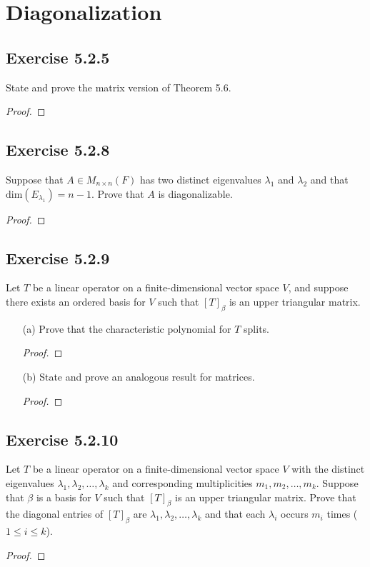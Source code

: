\section{Diagonalization}

\subsection*{Exercise 5.2.5} State and prove the matrix version of Theorem 5.6.
\begin{proof}

\end{proof}

\subsection*{Exercise 5.2.8} Suppose that \( A \in {M}_{n \times n }(F) \) has two distinct eigenvalues \( {\lambda}_{1} \) and \( {\lambda}_{2} \) and that \( \text{dim}({E}_{{\lambda}_{1}}) = n - 1  \). Prove that \( A  \) is diagonalizable.
\begin{proof}

\end{proof}

\subsection*{Exercise 5.2.9} Let \( T \) be a linear operator on a finite-dimensional vector space \( V  \), and suppose there exists an ordered basis for \( V  \) such that \( [T]_{\beta} \) is an upper triangular matrix.  
\begin{enumerate}
    \item[(a)] Prove that the characteristic polynomial for \( T  \) splits.
        \begin{proof}
        
        \end{proof}
    \item[(b)] State and prove an analogous result for matrices.
        \begin{proof}
        
        \end{proof}
\end{enumerate}

\subsection*{Exercise 5.2.10} Let \( T  \) be a linear operator on a finite-dimensional vector space \( V  \) with the distinct eigenvalues \( {\lambda}_{1}, {\lambda}_{2}, \dots, {\lambda}_{k} \) and corresponding multiplicities \( {m}_{1}, {m}_{2}, \dots, {m}_{k}  \). Suppose that \( \beta \) is a basis for \( V  \) such that \( [T]_{\beta} \) is an upper triangular matrix. Prove that the diagonal entries of \( [T]_{\beta} \) are \( {\lambda}_{1}, {\lambda}_{2}, \dots, {\lambda}_{k} \) and that each \( {\lambda}_{i} \) occurs \( {m}_{i} \) times (\( 1 \leq i \leq k  \)).
\begin{proof}

\end{proof}


